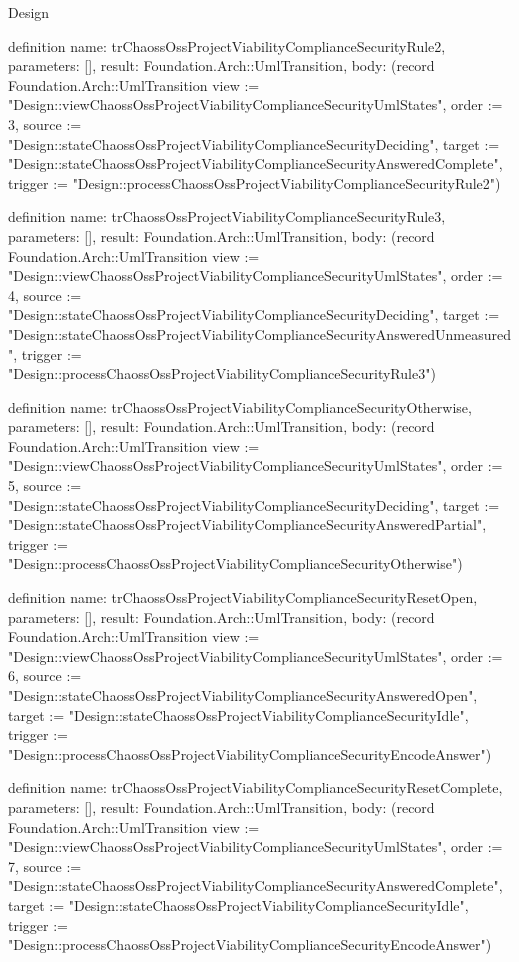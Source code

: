 \begin{lexlean}{Design}
\begin{semanticmodule}
definition{
  name: trChaossOssProjectViabilityComplianceSecurityRule2,
  parameters: [],
  result: Foundation.Arch::UmlTransition,
  body: (record Foundation.Arch::UmlTransition {view := "Design::viewChaossOssProjectViabilityComplianceSecurityUmlStates", order := 3, source := "Design::stateChaossOssProjectViabilityComplianceSecurityDeciding", target := "Design::stateChaossOssProjectViabilityComplianceSecurityAnsweredComplete", trigger := "Design::processChaossOssProjectViabilityComplianceSecurityRule2"})
}

definition{
  name: trChaossOssProjectViabilityComplianceSecurityRule3,
  parameters: [],
  result: Foundation.Arch::UmlTransition,
  body: (record Foundation.Arch::UmlTransition {view := "Design::viewChaossOssProjectViabilityComplianceSecurityUmlStates", order := 4, source := "Design::stateChaossOssProjectViabilityComplianceSecurityDeciding", target := "Design::stateChaossOssProjectViabilityComplianceSecurityAnsweredUnmeasured", trigger := "Design::processChaossOssProjectViabilityComplianceSecurityRule3"})
}

definition{
  name: trChaossOssProjectViabilityComplianceSecurityOtherwise,
  parameters: [],
  result: Foundation.Arch::UmlTransition,
  body: (record Foundation.Arch::UmlTransition {view := "Design::viewChaossOssProjectViabilityComplianceSecurityUmlStates", order := 5, source := "Design::stateChaossOssProjectViabilityComplianceSecurityDeciding", target := "Design::stateChaossOssProjectViabilityComplianceSecurityAnsweredPartial", trigger := "Design::processChaossOssProjectViabilityComplianceSecurityOtherwise"})
}

definition{
  name: trChaossOssProjectViabilityComplianceSecurityResetOpen,
  parameters: [],
  result: Foundation.Arch::UmlTransition,
  body: (record Foundation.Arch::UmlTransition {view := "Design::viewChaossOssProjectViabilityComplianceSecurityUmlStates", order := 6, source := "Design::stateChaossOssProjectViabilityComplianceSecurityAnsweredOpen", target := "Design::stateChaossOssProjectViabilityComplianceSecurityIdle", trigger := "Design::processChaossOssProjectViabilityComplianceSecurityEncodeAnswer"})
}

definition{
  name: trChaossOssProjectViabilityComplianceSecurityResetComplete,
  parameters: [],
  result: Foundation.Arch::UmlTransition,
  body: (record Foundation.Arch::UmlTransition {view := "Design::viewChaossOssProjectViabilityComplianceSecurityUmlStates", order := 7, source := "Design::stateChaossOssProjectViabilityComplianceSecurityAnsweredComplete", target := "Design::stateChaossOssProjectViabilityComplianceSecurityIdle", trigger := "Design::processChaossOssProjectViabilityComplianceSecurityEncodeAnswer"})
}


\end{semanticmodule}
\end{lexlean}
